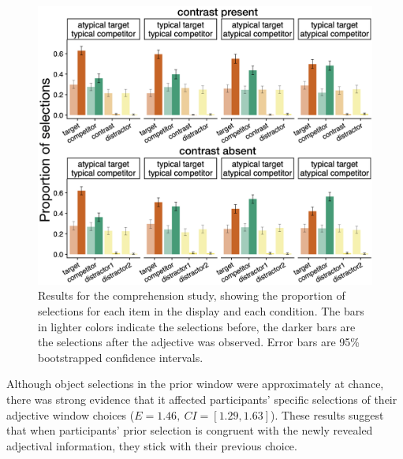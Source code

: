 \documentclass[a4paper,man,floatsintext,natbib]{apa6}
\begin{document}
\begin{figure}
	\begin{center}
		\includegraphics[width=1\textwidth]{img/comprehension/compr-results.png}
	\end{center}
\caption{Results for the comprehension study, showing the proportion of selections for each item in the display and each condition. The bars in lighter colors indicate the selections before, the darker bars are the selections after the adjective was observed. Error bars are 95\% bootstrapped confidence intervals.} 
\label{compr-results}
\end{figure}


Although object selections in the prior window were approximately at chance, there was strong evidence that it affected participants' specific selections of their adjective window choices ($E=1.46,\ CI=[1.29,1.63]$). These results suggest that when participants' prior selection is congruent with the newly revealed adjectival information, they stick with their previous choice. 
\end{document}

